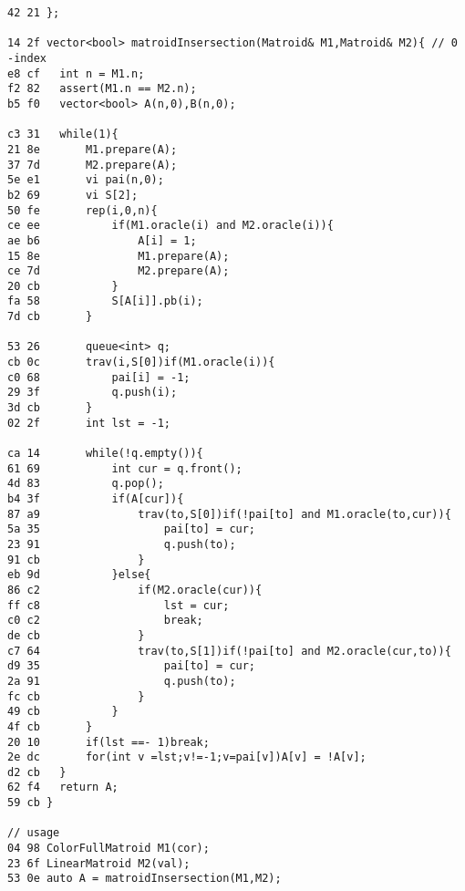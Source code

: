 \documentclass[11pt, a4paper, twoside]{article}
\begin{document}
\begin{lstlisting}
42 21 };

14 2f vector<bool> matroidInsersection(Matroid& M1,Matroid& M2){ // 0 -index
e8 cf 	int n = M1.n;
f2 82 	assert(M1.n == M2.n);
b5 f0 	vector<bool> A(n,0),B(n,0);
      	
c3 31 	while(1){
21 8e 		M1.prepare(A);
37 7d 		M2.prepare(A);
5e e1 		vi pai(n,0);
b2 69 		vi S[2];
50 fe 		rep(i,0,n){
ce ee 			if(M1.oracle(i) and M2.oracle(i)){
ae b6 				A[i] = 1;
15 8e 				M1.prepare(A);
ce 7d 				M2.prepare(A);
20 cb 			}
fa 58 			S[A[i]].pb(i);
7d cb 		}
      
53 26 		queue<int> q;
cb 0c 		trav(i,S[0])if(M1.oracle(i)){
c0 68 			pai[i] = -1;
29 3f 			q.push(i);
3d cb 		}
02 2f 		int lst = -1;
      
ca 14 		while(!q.empty()){
61 69 			int cur = q.front();
4d 83 			q.pop();
b4 3f 			if(A[cur]){
87 a9 				trav(to,S[0])if(!pai[to] and M1.oracle(to,cur)){
5a 35 					pai[to] = cur;
23 91 					q.push(to);
91 cb 				}
eb 9d 			}else{
86 c2 				if(M2.oracle(cur)){
ff c8 					lst = cur;
c0 c2 					break;
de cb 				}
c7 64 				trav(to,S[1])if(!pai[to] and M2.oracle(cur,to)){
d9 35 					pai[to] = cur;
2a 91 					q.push(to);
fc cb 				}
49 cb 			}
4f cb 		}
20 10 		if(lst ==- 1)break;
2e dc 		for(int v =lst;v!=-1;v=pai[v])A[v] = !A[v];
d2 cb 	}
62 f4 	return A;
59 cb }

// usage
04 98 ColorFullMatroid M1(cor);
23 6f LinearMatroid M2(val);
53 0e auto A = matroidInsersection(M1,M2);
\end{lstlisting}
\end{document}
